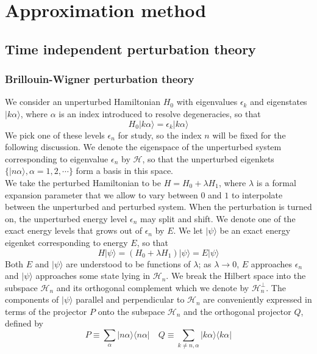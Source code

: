 \documentclass[cyan]{elegantnote}
\author{Yuyang Songsheng}
\begin{document}
\maketitle
\tableofcontents
\chapter{Approximation method}
\section{Time independent perturbation theory}
\subsection{Brillouin-Wigner perturbation theory}
We consider an unperturbed Hamiltonian $H_0$ with eigenvalues $\epsilon_k$ and eigenstates $|k\alpha\rangle$, where $\alpha$ is an index introduced to resolve degeneracies, so that
\[H_0 |k\alpha\rangle = \epsilon_k |k\alpha\rangle\]
We pick one of these levels $\epsilon_n$ for study, so the index $n$ will be fixed for the following discussion. We denote the eigenspace of the unperturbed system corresponding to eigenvalue  $\epsilon_n$ by $\mathcal{H}$, so that the unperturbed eigenkets
$\{ |n\alpha\rangle, \alpha = 1,2,\cdots\}$ form a basis in this space.\\
We take the perturbed Hamiltonian to be $H = H_0 + \lambda H_1$, where $\lambda$ is a formal expansion parameter that we allow to vary between $0$ and $1$ to interpolate between the unperturbed and perturbed system. When the perturbation is turned on, the unperturbed energy level $\epsilon_n$ may split and shift. We denote one of the exact energy levels that grows out of $\epsilon_n$ by $E$. We let $|\psi\rangle$ be an exact energy eigenket corresponding to energy $E$, so that
\[H|\psi\rangle = (H_0 + \lambda H_1)|\psi\rangle = E|\psi\rangle\]
Both $E$ and $|\psi\rangle$ are understood to be functions of $\lambda$; as $\lambda \to 0$, $E$ approaches $\epsilon_n$ and $|\psi\rangle$ approaches some state lying in $\mathcal{H}_n$. We break the Hilbert space into the subspace $\mathcal{H}_n$ and its orthogonal complement which we denote by $\mathcal{H}_n^{\bot}$. The components of $|\psi\rangle$ parallel and perpendicular to $\mathcal{H}_n$ are conveniently expressed in terms of the projector $P$ onto the subspace $\mathcal{H}_n$ and the orthogonal projector $Q$, defined by
\[P \equiv \sum_{\alpha} |n\alpha\rangle \langle n\alpha| \quad Q \equiv \sum_{k \neq n,\alpha} |k\alpha\rangle \langle k\alpha|\]
\end{document}
